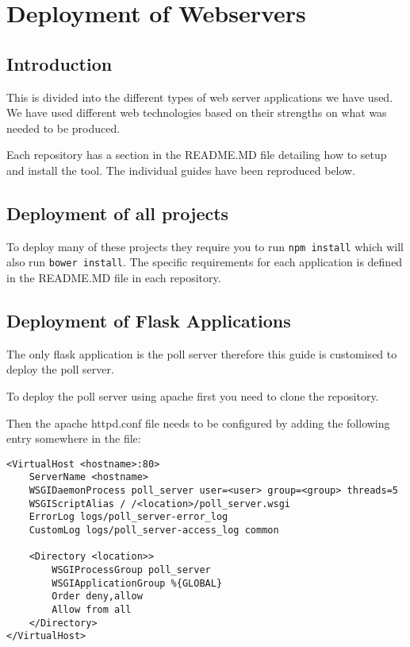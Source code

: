 \chapter{Deployment of Webservers} \label{Chapter:Deployment of Webservers}


\section{Introduction}

This is divided into the different types of web server applications we have used.
We have used different web technologies based on their strengths on what was needed to be produced.

Each repository has a section in the README.MD file detailing how to setup and install the tool. The individual guides have been reproduced below.

\section{Deployment of all projects}

To deploy many of these projects they require you to run \lstinline|npm install| which will also run \lstinline|bower install|. The specific requirements for each application is defined in the README.MD file in each repository.

\section{Deployment of Flask Applications} \label{Section:Deployment Flask Applications}

The only flask application is the poll server therefore this guide is customised to deploy the poll server.

To deploy the poll server using apache first you need to clone the repository.

Then the apache httpd.conf file needs to be configured by adding the following entry somewhere in the file:

\begin{lstlisting}[caption={Apache configuration}, label={code:apacheConfig_flask}]
<VirtualHost <hostname>:80>
	ServerName <hostname>
	WSGIDaemonProcess poll_server user=<user> group=<group> threads=5
	WSGIScriptAlias / /<location>/poll_server.wsgi
	ErrorLog logs/poll_server-error_log
	CustomLog logs/poll_server-access_log common

	<Directory <location>>
		WSGIProcessGroup poll_server
		WSGIApplicationGroup %{GLOBAL}
		Order deny,allow
		Allow from all
	</Directory>
</VirtualHost>
\end{lstlisting}


